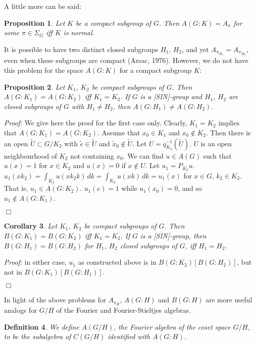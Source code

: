 \documentclass[12 pt]{article}
\newcommand\done{\begin{flushright}$\Box$\end{flushright}}
\newtheorem{defn}{Definition}
\newtheorem{prop}[defn]{Proposition}
\newtheorem{cor}[defn]{Corollary}
\begin{document}
A little more can be said:

\begin{prop}
Let $K$ be a compact subgroup of $G$.  Then $A(G:K) = A_\pi$ for some $\pi \in \Sigma_G$ iff $K$
is normal.
\end{prop}

\medskip
{} It is possible to have two distinct closed subgroups $H_1$, $H_2$, and yet
$A_{\pi_{H_1}} = A_{\pi_{H_2}}$, even when these subgroups are compact (Arsac, 1976).  However,
we do not have this problem for the space $A(G:K)$ for a compact subgroup $K$:

\begin{prop}\label{3.5}
Let $K_1$, $K_2$ be compact subgroups of $G$.  Then $A(G:K_1) = A(G:K_2)$ iff $K_1 = K_2$.
If $G$ is a [SIN]-group and $H_1$, $H_2$ are closed subgroups of $G$ with $H_1 \neq H_2$, then
$A(G:H_1) \neq A(G:H_2)$.
\end{prop}
{\it Proof:}
We give here the proof for the first case only.  Clearly, $K_1 = K_2$ implies that $A(G:K_1) = A(G:K_2)$.
Assume that $x_0 \in K_1$ and $x_0 \not\in K_2$.  Then there is an open $\tilde{U} \subset G/K_2$
with $\tilde{e}\in\tilde{U}$ and $\tilde{x}_0 \not\in \tilde{U}$.  Let $U = q_{K_2}^{-1}(\tilde{U})$.
$U$ is an open neighbourhood of $K_2$ not containing $x_0$.  We can find $u\in A(G)$ such that $u(x) = 1$
for $x\in K_2$ and $u(x)=0$ if $x\not\in U$.  Let $u_1 = P_{K_2}u$.
$u_{1}(xk_2) = \int_{K_2}u(xk_{2}k)\,dk = \int_{K_2}u(xk)\,dk = u_{1}(x)$ for $x\in G$, $k_2 \in K_2$.  That is,
$u_1 \in A(G:K_2)$.  $u_1(e) = 1$ while $u_1(x_0) = 0$, and so $u_1 \not\in A(G:K_1)$.\done

\begin{cor}
Let $K_1$, $K_2$ be compact subgroups of $G$.  Then $B(G:K_1) = B(G:K_2)$ iff $K_1 = K_2$.  If $G$
is a [SIN]-group, then $B(G:H_1) = B(G:H_2)$ for $H_1$, $H_2$ closed subgroups of $G$, iff $H_1 = H_2$.
\end{cor}
{\it Proof:}
in either case, $u_1$ as constructed above is in $B(G:K_2)$\;$[B(G:H_2)]$,
but not in $B(G:K_1)$\;$[B(G:H_1)]$.\done


In light of the above problems for $A_{\pi_H}$, $A(G:H)$ and $B(G:H)$ are more useful analogs for $G/H$ of the
Fourier and  Fourier-Stieltjes algebras.

\begin{defn}
We define $A(G/H)$, the Fourier algebra of the coset space $G/H$, to be the subalgebra
of $C(G/H)$ identified with $A(G:H)$.
\end{defn}
\end{document}
